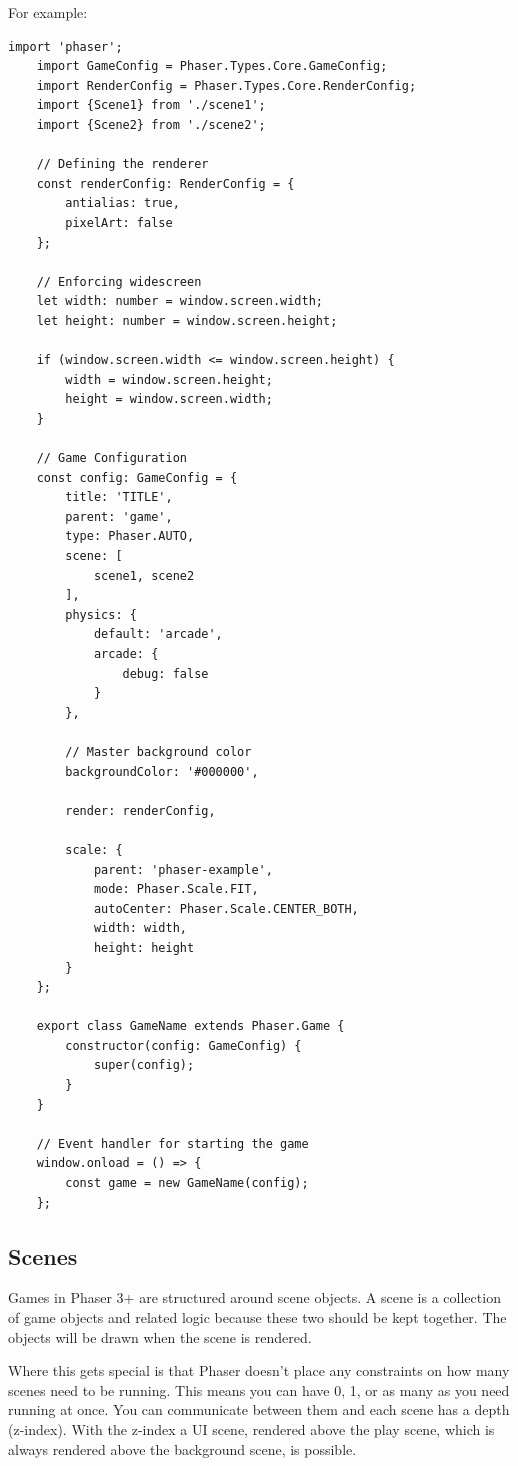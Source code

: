 For example:
\begin{lstlisting}[style=TypeScript, caption={Game Setup File}]
    import 'phaser';
    import GameConfig = Phaser.Types.Core.GameConfig;
    import RenderConfig = Phaser.Types.Core.RenderConfig;
    import {Scene1} from './scene1';
    import {Scene2} from './scene2';

    // Defining the renderer
    const renderConfig: RenderConfig = {
        antialias: true,
        pixelArt: false
    };

    // Enforcing widescreen
    let width: number = window.screen.width;
    let height: number = window.screen.height;

    if (window.screen.width <= window.screen.height) {
        width = window.screen.height;
        height = window.screen.width;
    }

    // Game Configuration
    const config: GameConfig = {
        title: 'TITLE',
        parent: 'game',
        type: Phaser.AUTO,
        scene: [
            scene1, scene2
        ],
        physics: {
            default: 'arcade',
            arcade: {
                debug: false
            }
        },

        // Master background color
        backgroundColor: '#000000',

        render: renderConfig,

        scale: {
            parent: 'phaser-example',
            mode: Phaser.Scale.FIT,
            autoCenter: Phaser.Scale.CENTER_BOTH,
            width: width,
            height: height
        }
    };

    export class GameName extends Phaser.Game {
        constructor(config: GameConfig) {
            super(config);
        }
    }

    // Event handler for starting the game
    window.onload = () => {
        const game = new GameName(config);
    };
\end{lstlisting}

\subsection{Scenes}\label{subsec:scenes}
Games in Phaser 3+ are structured around scene objects.
A scene is a collection of game objects and related logic because these two should be kept together.
The objects will be drawn when the scene is rendered.

Where this gets special is that Phaser doesn't place any constraints on how many scenes need to be running.
This means you can have 0, 1, or as many as you need running at once.
You can communicate between them and each scene has a depth (z-index).
With the z-index a UI scene, rendered above the play scene, which is always rendered above the background scene, is possible.

